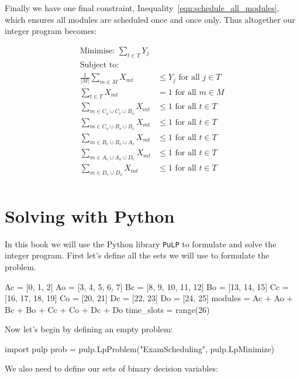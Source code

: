 Finally we have one final constraint, Inequality~\ref{eqn:schedule_all_modules},
which ensures all modules are scheduled once and once only.
Thus altogether our integer program becomes:

\begin{align}
\text{Minimise: } \sum_{t \in T} Y_j & \\\label{eqn:objective}
\text{Subject to: } & \nonumber \\
\frac{1}{|M|} \sum_{m \in M} X_{mt} &\leq Y_j \text{ for all } j \in T\\\label{eqn:auxiliary}
\sum_{t \in T} X_{mt} &= 1 \text{ for all } m \in M\\\label{eqn:schedule_all_modules}
\sum_{m \in C_o \cup C_c \cup B_o} X_{mt} &\leq 1 \text{ for all } t \in T\\\label{eqn:clique1}
\sum_{m \in C_o \cup B_o \cup B_c} X_{mt} &\leq 1 \text{ for all } t \in T\\\label{eqn:clique2}
\sum_{m \in B_c \cup B_o \cup A_c} X_{mt} &\leq 1 \text{ for all } t \in T\\\label{eqn:clique3}
\sum_{m \in A_c \cup A_o \cup D_c} X_{mt} &\leq 1 \text{ for all } t \in T\\\label{eqn:clique4}
\sum_{m \in D_c \cup D_o} X_{mt} & \leq 1 \text{ for all } t \in T\\\label{eqn:clique5}
\end{align}


\section{Solving with Python}\label{sec:solving-with-python}
In this book we will use the Python library \texttt{PuLP} to
formulate and solve the integer program. First let's define all the sets we
will use to formulate the problem.

\begin{pyin}
Ac = [0, 1, 2]
Ao = [3, 4, 5, 6, 7]
Bc = [8, 9, 10, 11, 12]
Bo = [13, 14, 15]
Cc = [16, 17, 18, 19]
Co = [20, 21]
Dc = [22, 23]
Do = [24, 25]
modules = Ac + Ao + Bc + Bo + Cc + Co + Dc + Do
time_slots = range(26)
\end{pyin}

Now let's begin by defining an empty problem:

\begin{pyin}
import pulp
prob = pulp.LpProblem("ExamScheduling", pulp.LpMinimize)
\end{pyin}

We also need to define our sets of binary decision variables:

